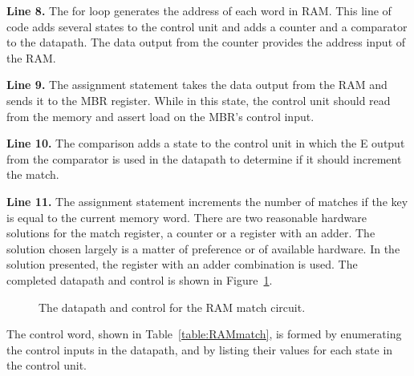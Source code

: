 {\bf Line 8.} The for loop generates the address of each word in RAM.  
This line of code adds several states to the control unit and adds
a counter and a comparator to the datapath.  The data output from
the counter provides the address input of the RAM.

{\bf Line 9.} The assignment statement takes the data output from the
RAM and sends it to the MBR register.  While in this state, the 
control unit should read from the memory and assert load on the
MBR's control input.

{\bf Line 10.}  The comparison adds a state to the control unit
in which the E output from the comparator is used in the 
datapath to determine if it should increment the match.

{\bf Line 11.}  The assignment statement increments the number of 
matches if the key is equal to the current memory word.  There
are two reasonable hardware solutions for the match register,
a counter or a register with an adder.  The solution chosen
largely is a matter of preference or of available hardware.
In the solution presented, the register with an adder 
combination is used.  The completed datapath and control is shown in 
Figure~\ref{fig:RAMmatch}.

\begin{figure}[ht]
\caption{The datapath and control for the RAM match circuit.}
\label{fig:RAMmatch}
\end{figure}

The control word, shown in Table~\ref{table:RAMmatch},
is formed by enumerating the control inputs in the datapath, and by 
listing their values for each state in the control unit.  

